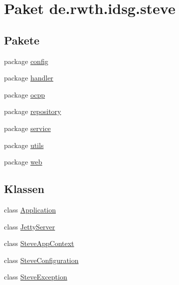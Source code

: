 \hypertarget{namespacede_1_1rwth_1_1idsg_1_1steve}{\section{Paket de.\-rwth.\-idsg.\-steve}
\label{namespacede_1_1rwth_1_1idsg_1_1steve}
}
\subsection*{Pakete}
\begin{DoxyCompactItemize}
\item 
package \hyperlink{namespacede_1_1rwth_1_1idsg_1_1steve_1_1config}{config}
\item 
package \hyperlink{namespacede_1_1rwth_1_1idsg_1_1steve_1_1handler}{handler}
\item 
package \hyperlink{namespacede_1_1rwth_1_1idsg_1_1steve_1_1ocpp}{ocpp}
\item 
package \hyperlink{namespacede_1_1rwth_1_1idsg_1_1steve_1_1repository}{repository}
\item 
package \hyperlink{namespacede_1_1rwth_1_1idsg_1_1steve_1_1service}{service}
\item 
package \hyperlink{namespacede_1_1rwth_1_1idsg_1_1steve_1_1utils}{utils}
\item 
package \hyperlink{namespacede_1_1rwth_1_1idsg_1_1steve_1_1web}{web}
\end{DoxyCompactItemize}
\subsection*{Klassen}
\begin{DoxyCompactItemize}
\item 
class \hyperlink{classde_1_1rwth_1_1idsg_1_1steve_1_1_application}{Application}
\item 
class \hyperlink{classde_1_1rwth_1_1idsg_1_1steve_1_1_jetty_server}{Jetty\-Server}
\item 
class \hyperlink{classde_1_1rwth_1_1idsg_1_1steve_1_1_steve_app_context}{Steve\-App\-Context}
\item 
class \hyperlink{classde_1_1rwth_1_1idsg_1_1steve_1_1_steve_configuration}{Steve\-Configuration}
\item 
class \hyperlink{classde_1_1rwth_1_1idsg_1_1steve_1_1_steve_exception}{Steve\-Exception}
\end{DoxyCompactItemize}
